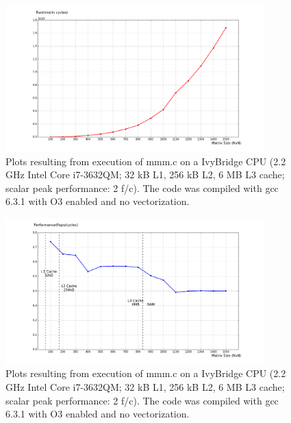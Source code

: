 \documentclass[letterpaper, 11pt]{article}
\begin{document}
\begin{figure}[h!]
    \centering
    \includegraphics[width=100mm]{sol_3_1}
    \caption{Plots resulting from execution of mmm.c on a IvyBridge CPU (2.2 GHz Intel Core i7-3632QM; 32 kB L1, 256 kB L2, 6 MB L3 cache; scalar peak performance: 2 f/c). The code was compiled with gcc 6.3.1 with O3 enabled and no vectorization.}
    \label{fig:runtime}
\end{figure}

\begin{figure}[h!]
    \centering
    \includegraphics[width=100mm]{sol_3_2}
    \caption{Plots resulting from execution of mmm.c on a IvyBridge CPU (2.2 GHz Intel Core i7-3632QM; 32 kB L1, 256 kB L2, 6 MB L3 cache; scalar peak performance: 2 f/c). The code was compiled with gcc 6.3.1 with O3 enabled and no vectorization.}
    \label{fig:performance}
\end{figure}
\end{document}
